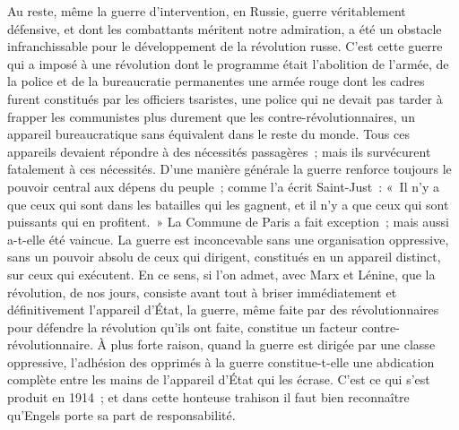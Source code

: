 \documentclass[french,twoside]{book} %
\begin{document}
Au reste, même la guerre d'intervention, en Russie, guerre véritablement défensive, et dont les combattants méritent notre admiration, a été un obstacle infranchissable pour le développement de la révolution russe. C'est cette guer­re qui a imposé à une révolution dont le programme était l'abolition de l'armée, de la police et de la bureaucratie permanentes une armée rouge dont les cadres furent constitués par les officiers tsaristes, une police qui ne devait pas tarder à frapper les communistes plus durement que les contre-révolution­naires, un appareil bureaucratique sans équivalent dans le reste du monde. Tous ces appareils devaient répondre à des nécessités passagères ; mais ils survécurent fatalement à ces nécessités. D'une manière générale la guerre renforce toujours le pouvoir central aux dépens du peuple ; comme l'a écrit Saint-Just : « Il n'y a que ceux qui sont dans les batailles qui les gagnent, et il n'y a que ceux qui sont puissants qui en profitent. » La Commune de Paris a fait exception ; mais aussi a-t-elle été vaincue. La guerre est inconcevable sans une organisation oppressive, sans un pouvoir absolu de ceux qui dirigent, constitués en un appareil distinct, sur ceux qui exécutent. En ce sens, si l'on admet, avec Marx et Lénine, que la révolution, de nos jours, consiste avant tout à briser immédiatement et définitivement l'appareil d'État, la guerre, même faite par des révolutionnaires pour défendre la révolution qu'ils ont faite, constitue un facteur contre-révolutionnaire. À plus forte raison, quand la guerre est dirigée par une classe oppressive, l'adhésion des opprimés à la guerre constitue-t-elle une abdication complète entre les mains de l'appareil d'État qui les écrase. C'est ce qui s'est produit en 1914 ; et dans cette honteuse trahison il faut bien reconnaître qu'Engels porte sa part de responsabilité.\par
\end{document}

